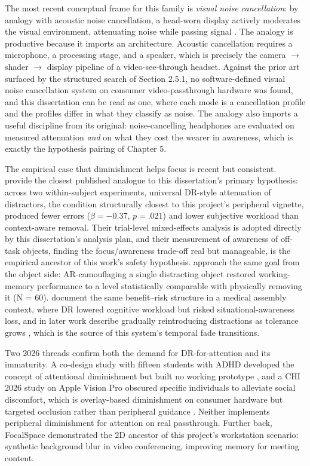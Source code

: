 The most recent conceptual frame for this family is \textit{visual noise cancellation}: by analogy
with acoustic noise cancellation, a head-worn display actively moderates the visual environment,
attenuating noise while passing signal \citep{hong2024}. The analogy is productive because it imports
an architecture. Acoustic cancellation requires a microphone, a processing stage, and a speaker,
which is precisely the camera $\rightarrow$ shader $\rightarrow$ display pipeline of a
video-see-through headset. Against the prior art surfaced by the structured search of Section 2.5.1,
no software-defined visual noise cancellation system on consumer video-passthrough hardware was
found, and this dissertation can be read as one, where each mode is a cancellation profile and the
profiles differ in what they classify as noise. The analogy also imports a useful discipline
from its original: noise-cancelling headphones are evaluated on measured attenuation \textit{and} on
what they cost the wearer in awareness, which is exactly the hypothesis pairing of Chapter 5.

The empirical case that diminishment helps focus is recent but consistent. \citet{mclaughlin2025}
provide the closest published analogue to this dissertation's primary hypothesis: across two
within-subject experiments, universal DR-style attenuation of distractors, the condition structurally
closest to this project's peripheral vignette, produced fewer errors ($\beta = -0.37$, $p = .021$) and
lower subjective workload than context-aware removal. Their trial-level mixed-effects analysis is
adopted directly by this dissertation's analysis plan, and their measurement of awareness of off-task
objects, finding the focus/awareness trade-off real but manageable, is the empirical ancestor of this
work's safety hypothesis. \citet{lee2025} approach the same goal from the object side: AR-camouflaging a single distracting
object restored working-memory performance to a level statistically comparable with physically
removing it (N = 60). \citet{murph2021} document the same benefit--risk structure in a medical
assembly context, where DR lowered cognitive workload but risked situational-awareness loss, and in
later work describe gradually reintroducing distractions as tolerance grows \citep{murph2022}, which
is the source of this system's temporal fade transitions.

Two 2026 threads confirm both the demand for DR-for-attention and its immaturity. A co-design
study with fifteen students with ADHD developed the concept of attentional diminishment but built no
working prototype \citep{exploring}, and a CHI 2026 study on Apple Vision Pro obscured specific
individuals to alleviate social discomfort, which is overlay-based diminishment on consumer hardware
but targeted occlusion rather than peripheral guidance \citep{obscuring}. Neither implements
peripheral diminishment for attention on real passthrough. Further back, FocalSpace \citep{yao2013}
demonstrated the 2D ancestor of this project's workstation scenario: synthetic background blur in
video conferencing, improving memory for meeting content.

